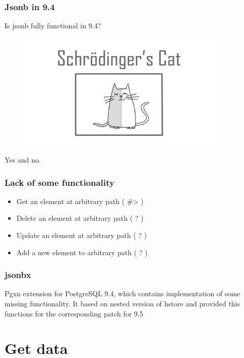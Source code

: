 \documentclass[14pt, compress]{beamer}
\begin{document}
\begin{frame}
    \frametitle{Jsonb in 9.4}
    \vspace{-30pt}
    Is jsonb fully functional in 9.4?
    \begin{figure}
        \includegraphics[width=10cm]{cat.jpg}
    \end{figure}

    \vspace{-10pt}
    Yes and no.

\end{frame}

\begin{frame}[fragile]
  \frametitle{Lack of some functionality}

  \begin{itemize}
      \item[\MVRightarrow] Get an element at arbitrary path ( \#> )
      \item[\MVRightarrow] Delete an element at arbitrary path  ( ? )
      \item[\MVRightarrow] Update an element at arbitrary path ( ? )
      \item[\MVRightarrow] Add a new element to arbitrary path ( ? )
  \end{itemize}

\end{frame}

\begin{frame}[fragile]
  \frametitle{jsonbx}

  Pgxn extension for PostgreSQL 9.4, which contains implementation of
  some missing functionality. It based on nested version of hstore
  and provided this functions for the corresponding patch for 9.5

\end{frame}

\section{Get data}
\end{document}
